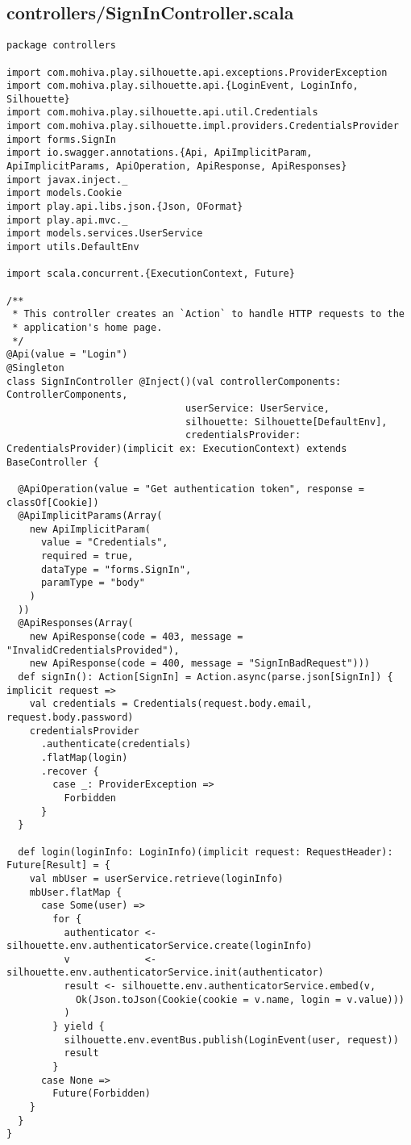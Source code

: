 \subsection{controllers/SignInController.scala}
\begin{lstlisting}
package controllers

import com.mohiva.play.silhouette.api.exceptions.ProviderException
import com.mohiva.play.silhouette.api.{LoginEvent, LoginInfo, Silhouette}
import com.mohiva.play.silhouette.api.util.Credentials
import com.mohiva.play.silhouette.impl.providers.CredentialsProvider
import forms.SignIn
import io.swagger.annotations.{Api, ApiImplicitParam, ApiImplicitParams, ApiOperation, ApiResponse, ApiResponses}
import javax.inject._
import models.Cookie
import play.api.libs.json.{Json, OFormat}
import play.api.mvc._
import models.services.UserService
import utils.DefaultEnv

import scala.concurrent.{ExecutionContext, Future}

/**
 * This controller creates an `Action` to handle HTTP requests to the
 * application's home page.
 */
@Api(value = "Login")
@Singleton
class SignInController @Inject()(val controllerComponents: ControllerComponents,
                               userService: UserService,
                               silhouette: Silhouette[DefaultEnv],
                               credentialsProvider: CredentialsProvider)(implicit ex: ExecutionContext) extends BaseController {

  @ApiOperation(value = "Get authentication token", response = classOf[Cookie])
  @ApiImplicitParams(Array(
    new ApiImplicitParam(
      value = "Credentials",
      required = true,
      dataType = "forms.SignIn",
      paramType = "body"
    )
  ))
  @ApiResponses(Array(
    new ApiResponse(code = 403, message = "InvalidCredentialsProvided"),
    new ApiResponse(code = 400, message = "SignInBadRequest")))
  def signIn(): Action[SignIn] = Action.async(parse.json[SignIn]) { implicit request =>
    val credentials = Credentials(request.body.email, request.body.password)
    credentialsProvider
      .authenticate(credentials)
      .flatMap(login)
      .recover {
        case _: ProviderException =>
          Forbidden
      }
  }

  def login(loginInfo: LoginInfo)(implicit request: RequestHeader): Future[Result] = {
    val mbUser = userService.retrieve(loginInfo)
    mbUser.flatMap {
      case Some(user) =>
        for {
          authenticator <- silhouette.env.authenticatorService.create(loginInfo)
          v             <- silhouette.env.authenticatorService.init(authenticator)
          result <- silhouette.env.authenticatorService.embed(v,
            Ok(Json.toJson(Cookie(cookie = v.name, login = v.value)))
          )
        } yield {
          silhouette.env.eventBus.publish(LoginEvent(user, request))
          result
        }
      case None =>
        Future(Forbidden)
    }
  }
}
\end{lstlisting}
